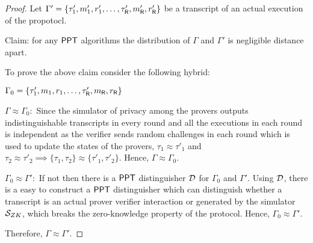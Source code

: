 \begin{proof}
Let $\Gamma' = \{\tau'_1, m'_1 ,r'_1, \ldots, \tau'_{\mathsf{R}}, m'_{\mathsf{R}}, r'_{\mathsf{R}} \}$ be a transcript of an actual execution of the propotocl.

Claim: for any $\mathsf{PPT}$ algorithms the distribution of $\Gamma$ and $\Gamma'$ is negligible distance apart.


To prove the above claim consider the following hybrid: 

$\Gamma_0 = \{\tau'_1, m_1 ,r_1, \ldots, \tau'_{\mathsf{R}}, m_{\mathsf{R}}, r_{\mathsf{R}} \}$

$\Gamma \approx \Gamma_0 : $ Since the simulator of privacy among the provers outputs indistinguishable transcripts in every round and all the executions in each round is independent as the verifier sends random challenges in each round which is used to update the states of the provers, $\tau_1 \approx \tau'_1$ and $\tau_2 \approx \tau'_2 \implies \{\tau_1, \tau_2\} \approx \{\tau'_1, \tau'_2\}$. Hence, $\Gamma \approx \Gamma_0$.

$\Gamma_0 \approx \Gamma': $ If not then there is a $\mathsf{PPT}$ distinguisher $\mathcal{D}$ for $\Gamma_0$ and $\Gamma'$. Using $\mathcal{D}$, there is a easy to construct a $\mathsf{PPT}$ distinguisher which can distinguish whether a transcript is an actual prover verifier interaction or generated by the simulator $\mathcal{S}_{ZK}$, which breaks the zero-knowledge property of the protocol. Hence, $\Gamma_0 \approx \Gamma'$.

Therefore, $\Gamma \approx \Gamma'$.
\begin{comment}
	\begin{itemize}
		\item If $\Sim$ requires to generate a value which is due to interaction among the prover and the verifier, then $\Sim$ calls $\Sim_{ZK}$ on input $\stmt, \wit_T$ and includes the output in the transcript.
		\item If $\Sim$ requires to generate a value which is due to interactioin among the provers, then $\Sim$ calls $\Sim_{P}$ on input $\stmt, \st^i_T, m_i$ and internally $\Sim_{P}$ calls $\Sim_{\pi_i}$ if $\Sim_{P}$ is called at the $i$th round of the ZK protocol, where if $i=1$ the $\st^i_T = \wit_T$ other set $\st^i_T$ from the output of the simulators in the previous step, then include the output in the transcript.
	\end{itemize}
	The following hybrids prove that $\Sim$ generates a transcript which is indistinguishable from an actual transcript.:
	\pnote{Joint distribution is indistinguishable}
	\begin{itemize}
		\item[$H_0$:] Real transcript
		\item[$H_1$:] Real transcript for interaction among provers and simulated transcript for zero knowledge generated by $\Sim_{ZK}$
		\item[$H_2$:] Simulated transcript for interaction among provers generated by $\Sim_P$ and simulated transcript for zero knowledge generated by $\Sim_{ZK}$
	\end{itemize}


\end{comment}
\end{proof}
